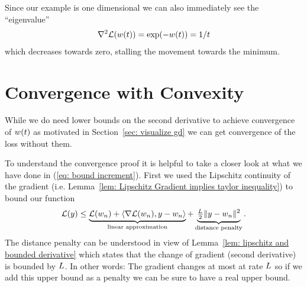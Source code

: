 Since our example is one dimensional we can also immediately see the ``eigenvalue''
%
\begin{align*}
	\nabla^2 \mathcal{L}(w(t)) = \exp(-w(t)) = 1/t
\end{align*}
%
which decreases towards zero, stalling the movement towards the minimum.

\section{Convergence with Convexity}\label{sec: convex convergence theorems}

While we do need lower bounds on the second derivative to achieve convergence
of \(w(t)\) as motivated in Section~\ref{sec: visualize gd} we can get
convergence of the loss without them.

To understand the convergence proof it is helpful to take a closer look at
what we have done in (\ref{eq: bound increment}). First we used the Lipschitz
continuity of the gradient (i.e. Lemma~\ref{lem: Lipschitz Gradient implies taylor inequality})
to bound our function
%
\begin{align}\label{eq: lin approx + distance penalty notion}
	\mathcal{L}(y)
	\le \underbrace{
		\mathcal{L}(w_n)+ \langle\nabla\mathcal{L}(w_n), y-w_n\rangle 
	}_{\text{linear approximation}}
	+ \underbrace{\tfrac{L}{2} \|y-w_n\|^2}_{\text{distance penalty}}.
\end{align}
%
The distance penalty can be understood in view of Lemma~\ref{lem: lipschitz and bounded derivative}
which states that the change of gradient (second derivative) is bounded by \(L\).
In other words: The gradient changes at most at rate \(L\) so if we
add this upper bound as a penalty we can be sure to have a real upper bound.

